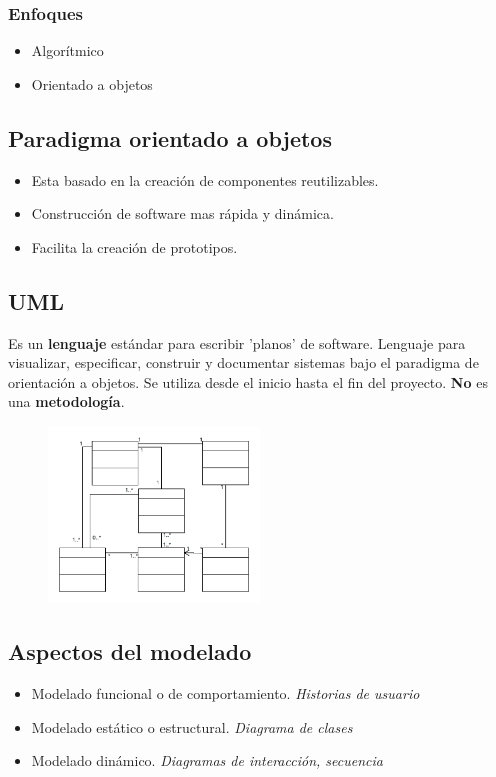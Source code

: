 \documentclass[titlepage,a4paper]{article}
\begin{document}
\subsubsection*{Enfoques}
    \begin{itemize}
        \item Algorítmico
        \item Orientado a objetos
    \end{itemize}

\subsection{Paradigma orientado a objetos}
    \begin{itemize}
        \item Esta basado en la creación de componentes reutilizables.
        \item Construcción de software mas rápida y dinámica.
        \item Facilita la creación de prototipos.
    \end{itemize}

\subsection{UML}
Es un \textbf{lenguaje} estándar para escribir 'planos' de software. Lenguaje para visualizar, especificar, construir y documentar sistemas bajo el paradigma de orientación a objetos. Se utiliza desde el inicio hasta el fin del proyecto.
\textbf{No} es una \textbf{metodología}.

    \begin{figure}[!htb]
        \centering
        \includegraphics[width=0.5\textwidth]{Imagenes/UML.png}
    \end{figure}

\subsection*{Aspectos del modelado}
    \begin{itemize}
        \item Modelado funcional o de comportamiento. \textit{Historias de usuario}
        \item Modelado estático o estructural. \textit{Diagrama de clases}
        \item Modelado dinámico. \textit{Diagramas de interacción, secuencia}
    \end{itemize}
\end{document}
